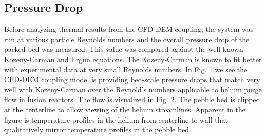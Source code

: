 \subsection{Pressure Drop}
Before analyzing thermal results from the CFD-DEM coupling, the system was run at various particle Reynolds numbers and the overall pressure drop of the packed bed was measured. This value was compared against the well-known Kozeny-Carman and Ergun equations. The Kozeny-Carman is known to fit better with experimental data at very small Reynolds numbers. In Fig. 1 we see the CFD-DEM coupling model is providing bed-scale pressure drops that match very well with Kozeny-Carman over the Reynold’s numbers applicable to helium purge flow in fusion reactors.
The flow is visualized in Fig. 2. The pebble bed is clipped at the centerline to allow viewing of the helium streamlines. Apparent in the figure is temperature profiles in the helium from centerline to wall that qualitatively mirror temperature profiles in the pebble bed.

